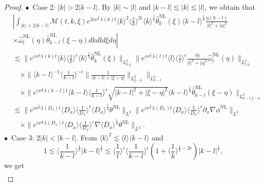 \documentclass[reqno, 12pt]{amsart} %
\theoremstyle{plain} %
\theoremstyle{definition}
\theoremstyle{remark}
\numberwithin{equation}{section} %
\newcommand{\no}{\nonumber}
\newcommand{\lt}{\left}
\newcommand{\rt}{\right}
\newcommand{\px}{\partial_x}
\begin{document}
\begin{proof}
		$\bullet$~Case 2:   $|k| > 2|k-l| $. By $ |k|\sim |l|$ and $|k-l|\lesssim |k| \lesssim |l|$,  we obtain that
		\begin{align} \label{eq:temp34}
			& \no\left| \int_{|k| > 2|k-l| } \mathcal{M}(t, k, \xi) e^{2 c \nu^{\frac{1}{3}} \lambda(k) t}\langle k\rangle^2\langle\frac{1}{k}\rangle^{2 \epsilon} \langle k \rangle^\frac13\hat{\theta}_k^{\mathrm{NL}}(\xi) \langle k-l \rangle^\frac13  \frac{\eta(k-l)}{|l|^2+|\eta|^2}\right. \\
			&\lt. \no\times \hat{\omega}_l^{\mathrm{NL}}(\eta) \hat{\theta}_{k-l}^{\mathrm{NL}}(\xi-\eta) d k d l d \xi d \eta \rt| \\
			&\no \lesssim\|e^{c \nu^{\frac{1}{3}} \lambda(k) t}  \langle k \rangle \langle \frac1k \rangle^\epsilon \langle k \rangle^\frac13  \hat{\theta}_k^{\mathrm{NL}}(\xi)\|_{L_{k, \xi}^2}\|e^{c \nu^{\frac{1}{3}} \lambda(l) t}\langle l\rangle\langle\frac{1}{l}\rangle^\epsilon   \frac{l\eta}{|l|^2  + |\eta|^2} \hat{\omega}_l^{\mathrm{NL}}(\eta)\|_{L_{l, \eta}^2}         \\
			& \no\quad \times \|\langle k- l\rangle^{-1}\langle\frac{1}{k-l}\rangle^{-\epsilon}   \| \frac{1}{|k-l| + |\xi - \eta|} \|_{L_{\xi - \eta}^2}\|_{L_{k-l}^2}  \\
			& \no\quad \times  \|e^{c \nu^{\frac{1}{3}} \lambda(k-l) t}\langle k-l \rangle  \langle \frac{1}{k-l} \rangle^\epsilon   \sqrt{|k-l|^2 + |\xi - \eta|^2 }\langle k-l \rangle ^\frac13  \hat{\theta}_{k-l}^{\mathrm{NL}}(\xi-\eta)\|_{L_{k-l, \xi-\eta}^2} \\
			&\no \lesssim\|e^{c \nu^{\frac{1}{3}} \lambda\left(D_x\right) t}\langle D_x\rangle    \langle \frac{1}{D_x}\rangle^\epsilon  \langle D_x \rangle^{\frac{1}{3}} \theta^{\mathrm{NL}}\|_{L^2} \|e^{c \nu^{\frac{1}{3}} \lambda\left(D_x\right) t}\langle D_x\rangle\langle\frac{1}{D_x}\rangle^\epsilon \px \nabla \phi^{\mathrm{NL}}\|_{L^2} \\
			& \quad \times\|e^{c \nu^{\frac{1}{3}} \lambda\left(D_x\right) t}\langle D_x\rangle\langle\frac{1}{D_x}\rangle^\epsilon \nabla \langle D_x \rangle^{\frac{1}{3}} \theta^{\mathrm{NL}}\|_{L^2} .
		\end{align}
		$\bullet$~Case 3:  $2|k| < |k-l| $. From $ \langle k \rangle^2 \lesssim \langle l \rangle \langle k-l \rangle$ and $$1 \lesssim \langle \frac{1}{k-l} \rangle^\frac12 |k-l|^{\frac12} \lesssim \langle\frac{1}{l}\rangle^\epsilon\langle\frac{1}{k-l}\rangle^\epsilon\left(1+\langle\frac{1}{k}\rangle^{\frac{1}{2}-2 \epsilon}\right)|k-l|^{\frac12},$$  we get
		\begin{align} \label{eq:temp35}

\end{align}
\end{proof}
\end{document}
